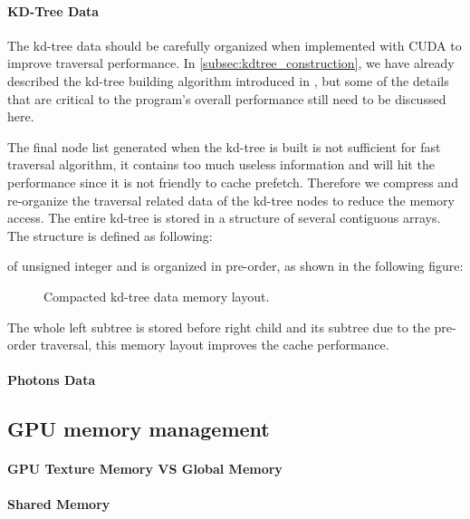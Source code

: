 \paragraph{KD-Tree Data} 

The kd-tree data should be carefully organized when implemented with CUDA to improve traversal performance. In \ref{subsec:kdtree_construction}, we have already described the kd-tree building algorithm introduced in \cite{Zhou2008}, but some of the details that are critical to the program's overall performance still need to be discussed here. 

The final node list generated when the kd-tree is built is not sufficient for fast traversal algorithm, it contains too much useless information and will hit the performance since it is not friendly to cache prefetch. Therefore we compress and re-organize the traversal related data of the kd-tree nodes to reduce the memory access. The entire kd-tree is stored in a structure of several contiguous arrays. The structure is defined as following:  

 

of unsigned integer and is organized in pre-order, as shown in the following figure: 

\begin{figure}[htp] 
    \centering 
    \renewcommand{\thefigure}{\thechapter.\arabic{figure}}
    \caption[]{Compacted kd-tree data memory layout.}
    \label{fig:kdtree_data_memory_layout} 
\end{figure}  

The whole left subtree is stored before right child and its subtree due to the pre-order traversal, this memory layout improves the cache performance. 


\paragraph{Photons Data} 


\subsection{GPU memory management}


\paragraph{GPU Texture Memory VS Global Memory} 


\paragraph{Shared Memory} 






